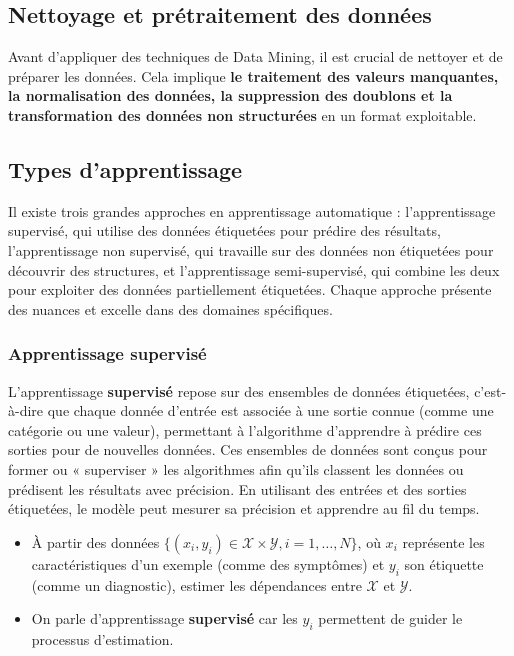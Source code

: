\documentclass[a4paper,14pt]{article}
\begin{document}
    \subsection{Nettoyage et prétraitement des données }
    
    Avant d’appliquer des techniques de Data Mining, il est crucial de nettoyer et de préparer les données. Cela implique \textbf{le traitement des valeurs manquantes, la normalisation des données, la suppression des doublons et la transformation des données non structurées} en un format exploitable.

    
    \subsection{Types d’apprentissage}
    
        Il existe trois grandes approches en apprentissage automatique : l'apprentissage supervisé, qui utilise des données étiquetées pour prédire des résultats, l'apprentissage non supervisé, qui travaille sur des données non étiquetées pour découvrir des structures, et l'apprentissage semi-supervisé, qui combine les deux pour exploiter des données partiellement étiquetées. Chaque approche présente des nuances et excelle dans des domaines spécifiques.
        
        \subsubsection{Apprentissage supervisé}
        
        L'apprentissage \textbf{supervisé} repose sur des ensembles de données étiquetées, c’est-à-dire que chaque donnée d’entrée est associée à une sortie connue (comme une catégorie ou une valeur), permettant à l’algorithme d’apprendre à prédire ces sorties pour de nouvelles données. Ces ensembles de données sont conçus pour former ou « superviser » les algorithmes afin qu'ils classent les données ou prédisent les résultats avec précision. En utilisant des entrées et des sorties étiquetées, le modèle peut mesurer sa précision et apprendre au fil du temps.
        
        
        \begin{itemize}
            \item  À partir des données \(\{(x_i, y_i) \in \mathcal{X} \times \mathcal{Y}, i = 1, \ldots, N\}\), où \(x_i\) représente les caractéristiques d’un exemple (comme des symptômes) et \(y_i\) son étiquette (comme un diagnostic), estimer les dépendances entre \(\mathcal{X}\) et \(\mathcal{Y}\).
            \item  On parle d'apprentissage \textbf{supervisé} car les \(y_i\) permettent de guider le processus d’estimation.
        \end{itemize}
        
\end{document}

